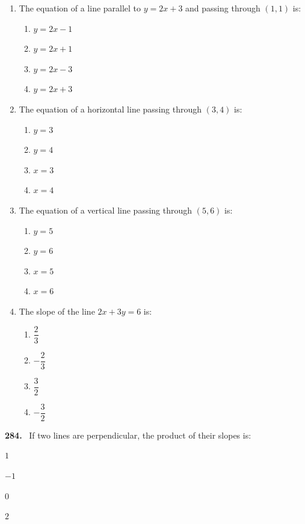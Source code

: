 \documentclass[11pt]{article}
\newenvironment{qenv}[1]{%
  \par\medskip\noindent\textbf{#1.}\ \ignorespaces
}{\par}
\begin{document}
\begin{enumerate}[label=\textbf{\arabic*.}, start=204, leftmargin=2em]
\item The equation of a line parallel to $y = 2x + 3$ and passing through $(1, 1)$ is:
\begin{enumerate}[label=(\Alph*)] \item $y = 2x - 1$ \item $y = 2x + 1$ \item $y = 2x - 3$ \item $y = 2x + 3$ \end{enumerate}

\item The equation of a horizontal line passing through $(3, 4)$ is:
\begin{enumerate}[label=(\Alph*)] \item $y = 3$ \item $y = 4$ \item $x = 3$ \item $x = 4$ \end{enumerate}

\item The equation of a vertical line passing through $(5, 6)$ is:
\begin{enumerate}[label=(\Alph*)] \item $y = 5$ \item $y = 6$ \item $x = 5$ \item $x = 6$ \end{enumerate}

\item The slope of the line $2x + 3y = 6$ is:
\begin{enumerate}[label=(\Alph*)] \item $\dfrac{2}{3}$ \item $-\dfrac{2}{3}$ \item $\dfrac{3}{2}$ \item $-\dfrac{3}{2}$ \end{enumerate}

\end{enumerate}




\begin{qenv}{284} If two lines are perpendicular, the product of their slopes is:
\begin{options} \item $1$ \item $-1$ \item $0$ \item $2$ \end{options} \end{qenv}
\end{document}
